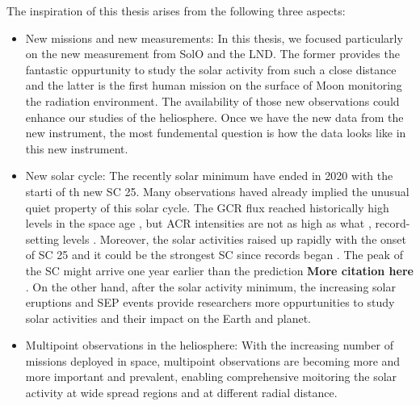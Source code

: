 The inspiration of this thesis arises from the following three aspects:
\begin{itemize}
	\item New missions and new measurements:
	In this thesis, we focused particularly on the new measurement from \ac{SolO} and the \ac{LND}. The former provides the fantastic oppurtunity to study the solar activity from such a close distance and the latter is the first human mission on the surface of Moon monitoring the radiation environment. The availability of those new observations could enhance our studies of the heliosphere. 
	Once we have the new data from the new instrument, the most fundemental question is how the data looks like in this new instrument.
	\item New solar cycle: The recently solar minimum have ended in 2020 with the starti of th new \ac{SC} 25. Many observations haved already implied the unusual quiet property of this solar cycle. The \ac{GCR} flux reached historically high levels in the space age \citep{Fu2021ApJS, Xu2022FrASS}, but ACR intensities are not as high as what , record-setting levels \citet{Strauss2023ApJ}. Moreover, the solar activities raised up rapidly with the onset of \ac{SC} 25 and it could be the strongest \ac{SC} since records began \citep{Nagovitsyn2023SoPh}. The peak of the \ac{SC} might arrive one year earlier than the prediction \textbf{More citation here} \citep{McIntosh2020SoPh}. On the other hand, after the solar activity minimum, the increasing solar eruptions and \ac{SEP} events provide researchers more oppurtunities to study solar activities and their impact on the Earth and planet.

	\item Multipoint observations in the heliosphere: With the increasing number of missions deployed in space, multipoint observations are becoming more and more important and prevalent, enabling comprehensive moitoring the solar activity at wide spread regions and at different radial distance. %
	
\end{itemize}

